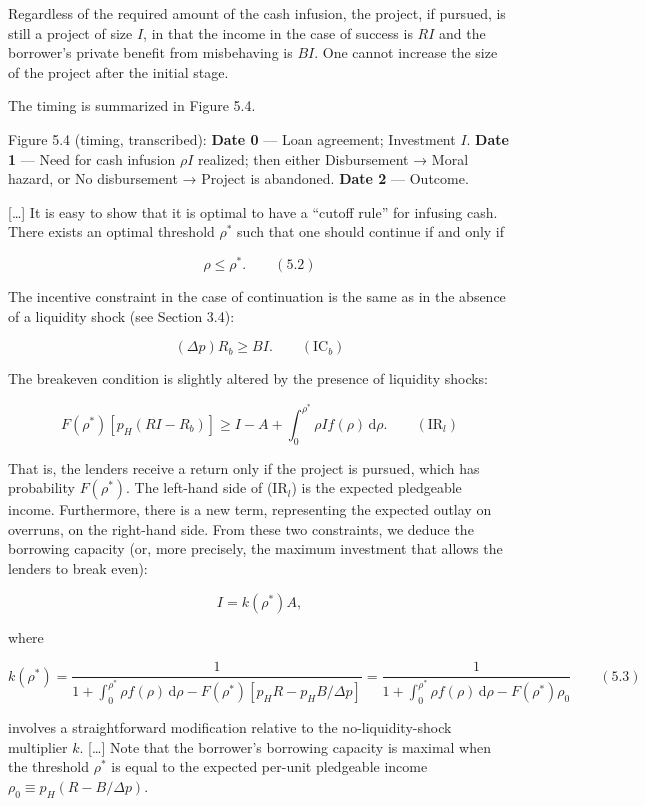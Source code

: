 \documentclass[11pt,a4paper]{article}
\begin{document}
Regardless of the required amount of the cash infusion, the project, if pursued, is still a project
of size \(I\), in that the income in the case of success is \(RI\) and the borrower's private
benefit from misbehaving is \(BI\). One cannot increase the size of the project after the initial
stage.

The timing is summarized in Figure 5.4.

Figure 5.4 (timing, transcribed): \textbf{Date 0} --- Loan agreement; Investment \(I\). \textbf{Date
1} --- Need for cash infusion \(\rho I\) realized; then either Disbursement → Moral hazard, or No
disbursement → Project is abandoned. \textbf{Date 2} --- Outcome.

{[}\ldots{]} It is easy to show that it is optimal to have a ``cutoff rule'' for infusing cash.
There exists an optimal threshold \(\rho^*\) such that one should continue if and only if

\[\rho \leqslant \rho^*. \qquad (5.2)\]

The incentive constraint in the case of continuation is the same as in the absence of a liquidity
shock (see Section 3.4):

\[(\Delta p)R_b \geqslant BI. \qquad (\text{IC}_b)\]

The breakeven condition is slightly altered by the presence of liquidity shocks:

\[F(\rho^*)[p_H(RI - R_b)] \geqslant I - A + \int_0^{\rho^*}\rho If(\rho)\,\mathrm{d}\rho. \qquad (\text{IR}_l)\]

That is, the lenders receive a return only if the project is pursued, which has probability
\(F(\rho^*)\). The left-hand side of (IR\(_l\)) is the expected pledgeable income. Furthermore,
there is a new term, representing the expected outlay on overruns, on the right-hand side. From
these two constraints, we deduce the borrowing capacity (or, more precisely, the maximum investment
that allows the lenders to break even):

\[I = k(\rho^*)A,\]

where

\[k(\rho^*) = \frac{1}{1 + \int_0^{\rho^*}\rho f(\rho)\,\mathrm{d}\rho - F(\rho^*)[p_HR - p_HB/\Delta p]} = \frac{1}{1 + \int_0^{\rho^*}\rho f(\rho)\,\mathrm{d}\rho - F(\rho^*)\rho_0} \qquad (5.3)\]

involves a straightforward modification relative to the no-liquidity-shock multiplier \(k\).
{[}\ldots{]} Note that the borrower's borrowing capacity is maximal when the threshold \(\rho^*\) is
equal to the expected per-unit pledgeable income \(\rho_0 \equiv p_H(R - B/\Delta p)\).
\end{document}
